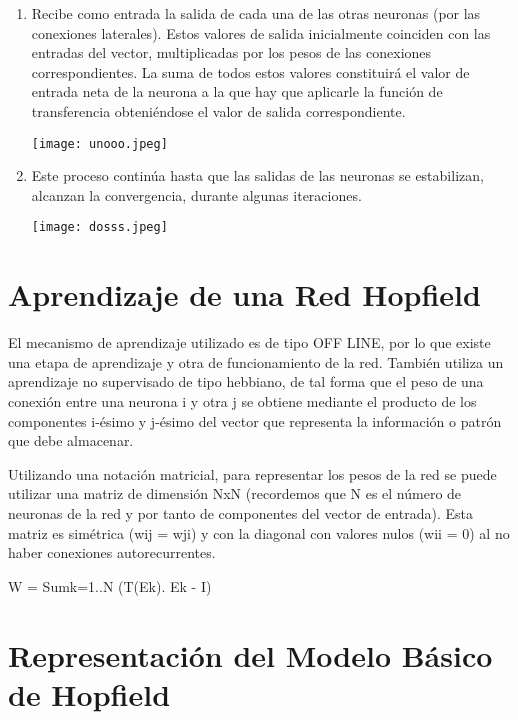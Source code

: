 \documentclass[12pt]{article}
\begin{document}
\begin{enumerate}
    \item Recibe como entrada la salida de cada una de las otras neuronas (por las conexiones laterales). Estos valores de salida inicialmente coinciden con las entradas del vector, multiplicadas por los pesos de las conexiones correspondientes. La suma de todos estos valores constituirá el valor de entrada neta de la neurona a la que hay que aplicarle la función de transferencia obteniéndose el valor de salida correspondiente.
    
    \begin{center}
    \texttt{[image: unooo.jpeg]}
    \end{center}
    
    \item Este proceso continúa hasta que las salidas de las neuronas se estabilizan, alcanzan la convergencia, durante algunas iteraciones.
    
    \begin{center}
    \texttt{[image: dosss.jpeg]}
    \end{center}
    
\end{enumerate}


\section*{Aprendizaje de una Red Hopfield}
El mecanismo de aprendizaje utilizado es de tipo OFF LINE, por lo que existe una etapa de aprendizaje y otra de funcionamiento de la red. También utiliza un aprendizaje no supervisado de tipo hebbiano, de tal forma que el peso de una conexión entre una neurona i y otra j se obtiene mediante el producto de los componentes i-ésimo y j-ésimo del vector que representa la información o patrón que debe almacenar.

Utilizando una notación matricial, para representar los pesos de la red se puede utilizar una matriz de dimensión NxN (recordemos que N es el número de neuronas de la red y por tanto de componentes del vector de entrada). Esta matriz es simétrica (wij = wji) y con la diagonal con valores nulos (wii = 0) al no haber conexiones autorecurrentes.


\begin{center}
W = Sumk=1..N (T(Ek). Ek - I)
\end{center} 

\section*{\textbf Representación del Modelo Básico de Hopfield}
\end{document}
